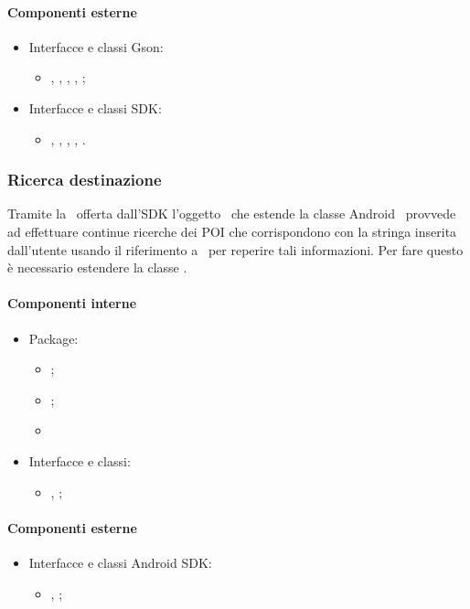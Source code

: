 \documentclass[../Funzionalita.tex]{subfiles}
\begin{document}
			\paragraph*{Componenti esterne}
			\begin{itemize}
			
				\item Interfacce e classi Gson:
				\begin{itemize}
					\item[]	\Gson, \GsonBuilder, \JsonObject, \JsonArray, \JsonParser;
				\end{itemize}
				
				\item Interfacce e classi SDK:
				\begin{itemize}
					\item[]	\SQLiteOpenHelper, \SQLiteDatabase, \Cursor, \ContentValue, \BaseColumns.
				\end{itemize}
				
			\end{itemize}
			
		\newpage
		\subsubsection{Ricerca destinazione}
			Tramite la \SearchView\ offerta dall'SDK l'oggetto \SearchSuggestionsProvider\ che estende la classe Android \ContentProvider\ provvede ad effettuare continue ricerche dei \Gls{POI} che corrispondono con la stringa inserita dall'utente usando il riferimento a \InformationManager\ per reperire tali informazioni. Per fare questo è necessario estendere la classe \ContentProvider.
		
			\paragraph*{Componenti interne}
			\begin{itemize}
			
				\item Package:
				\begin{itemize}
					\item[] \view;
					\item[] \presenter;
					\item[] \model
				\end{itemize}
				
				\item Interfacce e classi:
				\begin{itemize}
					\item[] \SearchSuggestionsProvider, \InformationManager;
				\end{itemize}
			\end{itemize}

			\paragraph*{Componenti esterne}
			\begin{itemize}
			
				\item Interfacce e classi \gls{Android} SDK:
				\begin{itemize}
					\item[] \SearchView, \ContentProvider;
				\end{itemize}
			\end{itemize}
		
\end{document}
